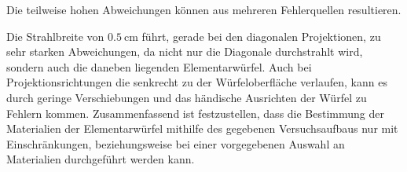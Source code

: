 Die teilweise hohen Abweichungen können aus mehreren Fehlerquellen resultieren.

Die Strahlbreite von $\qty{0.5}{\centi\meter}$ führt, gerade bei den diagonalen Projektionen, zu sehr starken Abweichungen,
da nicht nur die Diagonale durchstrahlt wird, sondern auch die daneben liegenden Elementarwürfel.
Auch bei Projektionsrichtungen die senkrecht zu der Würfeloberfläche verlaufen, kann es durch geringe Verschiebungen und das händische Ausrichten
der Würfel zu Fehlern kommen.
Zusammenfassend ist festzustellen, dass die Bestimmung der Materialien der Elementarwürfel mithilfe des gegebenen Versuchsaufbaus nur mit Einschränkungen,
beziehungsweise bei einer vorgegebenen Auswahl an Materialien durchgeführt werden kann.
\pagebreak